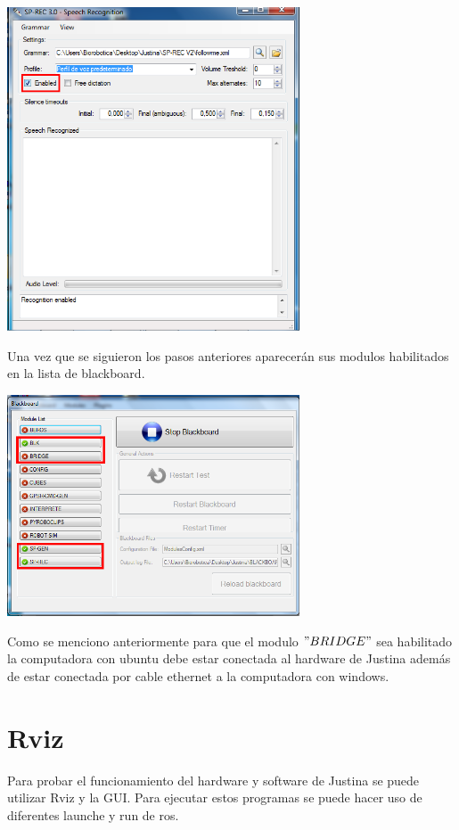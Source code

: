 \documentclass[user_manual.tex]{subfiles}
\begin{document}
\begin{center}
\includegraphics[width=0.65\textwidth]{Figures/Puesta_marcha/SPREC_enable.png}
\end{center}

Una vez que se siguieron los pasos anteriores aparecerán sus modulos habilitados en la lista de blackboard.

\begin{center}
\includegraphics[width=0.65\textwidth]{Figures/Puesta_marcha/Modulos_activados.png}
\end{center}

Como se menciono anteriormente para que el modulo $"BRIDGE"$ sea habilitado la computadora con ubuntu debe estar conectada al hardware de Justina además de estar conectada por cable ethernet a la computadora con windows.

\section{Rviz}
Para probar el funcionamiento del hardware y software de Justina se puede utilizar Rviz y la GUI. Para ejecutar estos programas se puede hacer uso de diferentes launche y run de ros.\\
\end{document}
